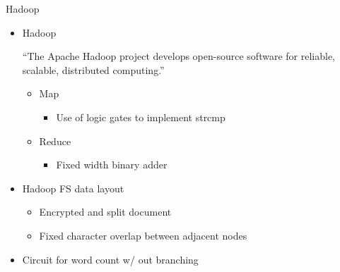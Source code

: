 \documentclass[dvips,11pt]{beamer}
\begin{document}
\begin{frame}{Hadoop}
  \begin{itemize}
  \item Hadoop 

      ``The Apache Hadoop project develops open-source software for reliable, scalable, distributed computing.''

    \begin{itemize}
    \item Map 
      \begin{itemize}
        \item Use of logic gates to implement strcmp
      \end{itemize}
    \item Reduce 
      \begin{itemize}
      \item Fixed width binary adder
      \end{itemize}
      
    \end{itemize} 
  \item Hadoop FS data layout
    \begin{itemize}
      \item Encrypted and split document
      \item Fixed character overlap between adjacent nodes
    \end{itemize}
  \item Circuit for word count w/ out branching 
  \end{itemize} 
\end{frame}
\end{document}
